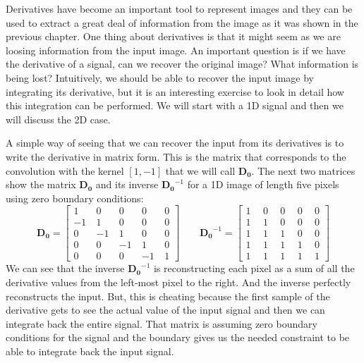 Derivatives have become an important tool to represent images and they can be used to extract a great deal of information from the image as it was shown in the previous chapter. One thing about derivatives is that it might seem as we are loosing information from the input image. An important question is if we have the derivative of a signal, can we recover the original image? What information is being lost? Intuitively, we should be able to recover the input image by integrating its derivative, but it is an interesting exercise to look in detail how this integration can be performed. We will start with a 1D signal and then we will discuss the 2D case.

A simple way of seeing that we can recover the input from its derivatives is to write the derivative in matrix form. This is the matrix that corresponds to the convolution with the kernel $\left[1, -1 \right]$ that we will call $\mathbf{D_0}$. The next two matrices show the matrix $\mathbf{D_0}$ and its inverse $\mathbf{D_0}^{-1}$ for a 1D image of length five pixels using zero boundary conditions:
\begin{equation}
	\mathbf{D_0} =
	\begin{bmatrix}
		1 ~  & 0 ~  & 0 ~  & 0~   & 0 \\
		-1 ~ & 1 ~  & 0 ~  & 0~   & 0 \\
		0 ~  & -1 ~ & 1 ~  & 0 ~  & 0 \\
		0~   & 0 ~  & -1 ~ & 1 ~  & 0 \\
		0~   & 0 ~  & 0 ~  & -1 ~ & 1
	\end{bmatrix}
	~~~~~~~~~
	\mathbf{D_0}^{-1} =
	\begin{bmatrix}
		1 ~ & ~ 0 ~ & ~ 0 ~ & ~ 0~  & ~ 0 \\
		1 ~ & ~ 1 ~ & ~ 0 ~ & ~ 0~  & ~ 0 \\
		1 ~ & ~ 1 ~ & ~ 1 ~ & ~ 0 ~ & ~ 0 \\
		1~  & ~ 1 ~ & ~ 1 ~ & ~ 1 ~ & ~ 0 \\
		1~  & ~ 1 ~ & ~ 1 ~ & ~ 1 ~ & ~ 1
	\end{bmatrix}
\end{equation}
We can see that the inverse $\mathbf{D_0}^{-1}$ is reconstructing each pixel as a sum of all the derivative values from the left-most pixel to the right.  And the inverse perfectly reconstructs the input. But, this is cheating because the first sample of the derivative gets to see the actual value of the input signal and then we can integrate back the entire signal. That matrix is assuming zero boundary conditions for the signal and the boundary gives us the needed constraint to be able to integrate back the input signal.

